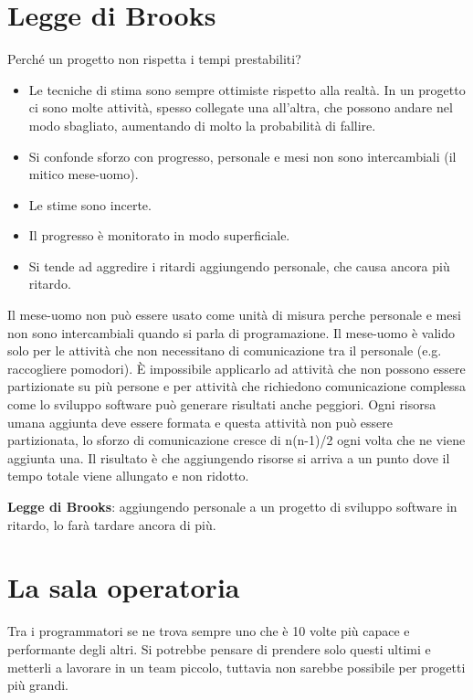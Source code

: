 \documentclass[a4paper,12pt,titlepage,oneside]{book}
\begin{document}
\section{Legge di Brooks}
Perché un progetto non rispetta i tempi prestabiliti?
\begin{itemize}
    \item Le tecniche di stima sono sempre ottimiste rispetto alla realtà.
        In un progetto ci sono molte attività, spesso collegate una all'altra, che possono andare nel modo sbagliato, aumentando di molto la probabilità di fallire.
    \item Si confonde sforzo con progresso, personale e mesi non sono intercambiali (il mitico mese-uomo).
    \item Le stime sono incerte.
    \item Il progresso è monitorato in modo superficiale.
    \item Si tende ad aggredire i ritardi aggiungendo personale, che causa ancora più ritardo.
\end{itemize}
Il mese-uomo non può essere usato come unità di misura perche personale e mesi non sono intercambiali quando si parla di programazione. Il mese-uomo è valido solo per le attività che non necessitano di comunicazione tra il personale (e.g. raccogliere pomodori). È impossibile applicarlo ad attività che non possono essere partizionate su più persone e per attività che richiedono comunicazione complessa come lo sviluppo software può generare risultati anche peggiori.
Ogni risorsa umana aggiunta deve essere formata e questa attività non può essere partizionata, lo sforzo di comunicazione cresce di n(n-1)/2 ogni volta che ne viene aggiunta una.
Il risultato è che aggiungendo risorse si arriva a un punto dove il tempo totale viene allungato e non ridotto.

\textbf{Legge di Brooks}: aggiungendo personale a un progetto di sviluppo software in ritardo, lo farà tardare ancora di più.

\section{La sala operatoria}
Tra i programmatori se ne trova sempre uno che è 10 volte più capace e performante degli altri. Si potrebbe pensare di prendere solo questi ultimi e metterli a lavorare in un team piccolo, tuttavia non sarebbe possibile per progetti più grandi.
\end{document}
